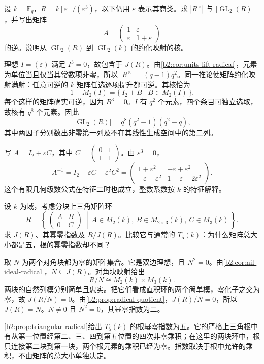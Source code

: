 \begin{exercise}\label{b2:ex:14-units-lift}
	设 \(k=\mathbb F_q\)，\(R=k[\varepsilon]/(\varepsilon^3)\)，以下仍用 \(\varepsilon\) 表示其商类。求 \(|R^\times|\) 与 \(|\operatorname{GL}_2(R)|\)，并写出矩阵
	\[
		A=\begin{pmatrix}1&\varepsilon\\\varepsilon&1+\varepsilon\end{pmatrix}
	\]
	的逆。说明从 \(\operatorname{GL}_2(R)\) 到 \(\operatorname{GL}_2(k)\) 的约化映射的核。
\end{exercise}
\begin{solution}
	理想 \(I=(\varepsilon)\) 满足 \(I^3=0\)，故包含于 \(J(R)\)。由\cref{b2:cor:units-lift-radical}，元素为单位当且仅当其常数项非零，所以 \(|R^\times|=(q-1)q^2\)。同一推论使矩阵约化映射满射：任意可逆的 \(k\) 矩阵任选逐项提升都可逆。其核恰为
	\[
		1+M_2(I)=\{\,I_2+B\mid B\in M_2(I)\,\}.
	\]
	每个这样的矩阵确实可逆，因为 \(B^3=0\)。\(I\) 有 \(q^2\) 个元素，四个条目可独立选取，故核有 \(q^8\) 个元素。因此
	\[
		|\operatorname{GL}_2(R)|=q^8(q^2-1)(q^2-q),
	\]
	其中两因子分别数出非零第一列及不在其线性生成空间中的第二列。

	写 \(A=I_2+\varepsilon C\)，其中 \(C=\begin{pmatrix}0&1\\1&1\end{pmatrix}\)。由 \(\varepsilon^3=0\)，
	\[
		A^{-1}=I_2-\varepsilon C+\varepsilon^2C^2
		=\begin{pmatrix}
			1+\varepsilon^2&-\varepsilon+\varepsilon^2\\
			-\varepsilon+\varepsilon^2&1-\varepsilon+2\varepsilon^2
		\end{pmatrix}.
	\]
	这个有限几何级数公式在特征二时也成立，整数系数按 \(k\) 的特征解释。
\end{solution}

\begin{exercise}\label{b2:ex:14-triangular-radical}
	设 \(k\) 为域，考虑分块上三角矩阵环
	\[
		R=\left\{\,
		\begin{pmatrix}A&B\\0&C\end{pmatrix}
		\ \middle|\ A\in M_2(k),\ B\in M_{2\times3}(k),\ C\in M_3(k) \,\right\}.
	\]
	求 \(J(R)\)、其幂零指数及 \(R/J(R)\)。比较它与通常的 \(T_5(k)\)：为什么矩阵总大小都是五，根的幂零指数却不同？
\end{exercise}
\begin{solution}
	取 \(N\) 为两个对角块都为零的矩阵集合。它是双边理想，且 \(N^2=0\)。由\cref{b2:cor:nil-ideal-radical}，\(N\subseteq J(R)\)。对角块映射给出
	\[
		R/N\cong M_2(k)\times M_3(k).
	\]
	两块的自然列模分别简单且忠实。把它们看成直积环的两个简单模，零化子之交为零，故 \(J(R/N)=0\)。由\cref{b2:prop:radical-quotient}，\(J(R)/N=0\)，所以 \(J(R)=N\)。\(N\ne0\) 且 \(N^2=0\)，其幂零指数为二。

	\cref{b2:prop:triangular-radical}给出 \(T_5(k)\) 的根幂零指数为五。它的严格上三角根中有从第一位置经第二、三、四到第五位置的四次非零乘积；在这里的两块环中，根只连接第二块到第一块，两个根元素的乘积已经为零。指数取决于根中允许的乘积，不由矩阵的总大小单独决定。
\end{solution}

